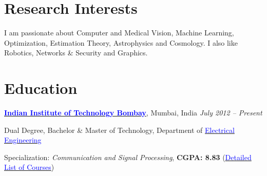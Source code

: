 \documentclass[margin,line]{res}
\newenvironment{list1}{
  \begin{list}{\ding{113}}{%
      \setlength{\itemsep}{0in}
      \setlength{\parsep}{0in} \setlength{\parskip}{0in}
      \setlength{\topsep}{0in} \setlength{\partopsep}{0in} 
      \setlength{\leftmargin}{0.17in}}}{\end{list}}
\begin{document}

\begin{resume}


\section{\sc Research Interests}
I am passionate about Computer and Medical Vision, Machine Learning, Optimization, Estimation Theory, Astrophysics and Cosmology. I also like Robotics, Networks \& Security and Graphics.

\vspace*{-0.13in}

\section{\sc Education}
{\bf \href{http://www.iitb.ac.in/}{\textcolor{blue}{Indian Institute of Technology Bombay}}}, Mumbai, India \hfill {\it July 2012 -- Present} \\
\vspace*{-.1in}
\begin{list1}
\item[] Dual Degree, Bachelor \& Master of Technology, Department of \href{http://www.ee.iitb.ac.in/}{\textcolor{blue}{Electrical Engineering}}
\item[] Specialization: {\em Communication and Signal Processing}, {\bf CGPA: 8.83} (\hyperlink{crselst}{\textcolor{blue}{Detailed List of Courses}})
\end{list1}


\end{resume}
\end{document}
